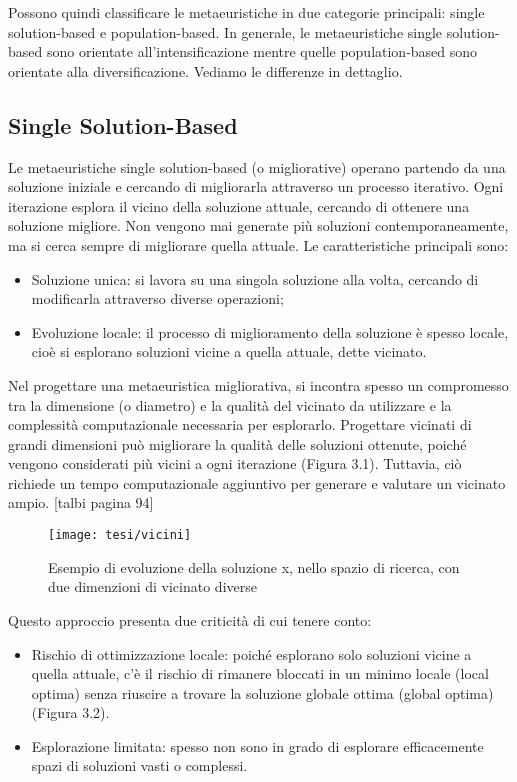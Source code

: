 Possono quindi classificare le metaeuristiche in due categorie principali: single solution-based e population-based. In generale, le metaeuristiche single solution-based sono orientate all'intensificazione mentre quelle population-based sono orientate alla diversificazione.
Vediamo le differenze in dettaglio.

\subsection{Single Solution-Based}

Le metaeuristiche single solution-based (o migliorative) operano partendo da una soluzione iniziale e cercando di migliorarla attraverso un processo iterativo. Ogni iterazione esplora il vicino della soluzione attuale, cercando di ottenere una soluzione migliore. Non vengono mai generate più soluzioni contemporaneamente, ma si cerca sempre di migliorare quella attuale. Le caratteristiche principali sono:
\begin{itemize}
    \item Soluzione unica: si lavora su una singola soluzione alla volta, cercando di modificarla attraverso diverse operazioni;
    \item Evoluzione locale: il processo di miglioramento della soluzione è spesso locale, cioè si esplorano soluzioni vicine a quella attuale, dette vicinato.
\end{itemize}
Nel progettare una metaeuristica migliorativa, si incontra spesso un compromesso tra la dimensione (o diametro) e la qualità del vicinato da utilizzare e la complessità computazionale necessaria per esplorarlo. Progettare vicinati di grandi dimensioni può migliorare la qualità delle soluzioni ottenute, poiché vengono considerati più vicini a ogni iterazione (Figura 3.1). Tuttavia, ciò richiede un tempo computazionale aggiuntivo per generare e valutare un vicinato ampio. [talbi pagina 94]
\begin{figure}[h!] 
    \centering 
    \texttt{[image: tesi/vicini]} 
    \caption{Esempio di evoluzione della soluzione x, nello spazio di ricerca, con due dimenzioni di vicinato diverse}
\end{figure}

Questo approccio presenta due criticità di cui tenere conto:
\begin{itemize}
    \item Rischio di ottimizzazione locale: poiché esplorano solo soluzioni vicine a quella attuale, c'è il rischio di rimanere bloccati in un minimo locale (local optima) senza riuscire a trovare la soluzione globale ottima (global optima) (Figura 3.2).
    \item Esplorazione limitata: spesso non sono in grado di esplorare efficacemente spazi di soluzioni vasti o complessi.
\end{itemize}

